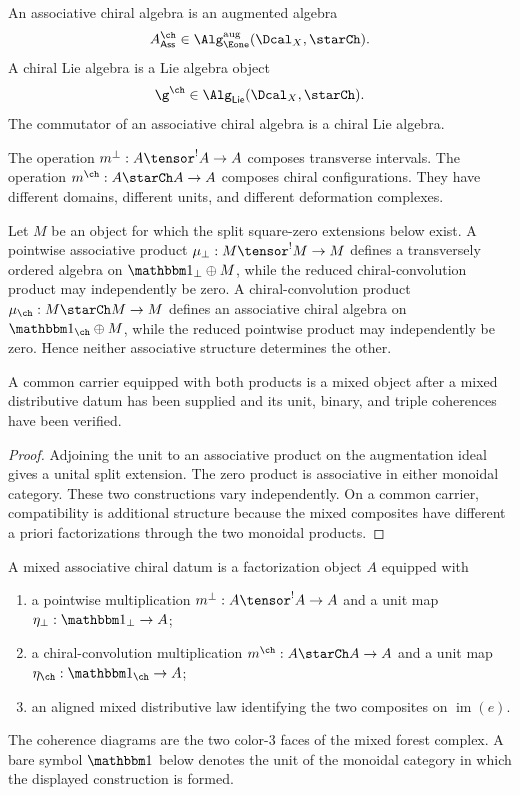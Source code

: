 \begin{definition}
An associative chiral algebra is an augmented algebra
\[
 A^{\ch}_{\mathsf{Ass}}
 \in\Alg_{\Eone}^{\mathrm{aug}}(\Dcal_X,\starCh).
\]
A chiral Lie algebra is a Lie algebra object
\[
 \g^{\ch}\in\Alg_{\mathsf{Lie}}(\Dcal_X,\starCh).
\]
The commutator of an associative chiral algebra is a chiral Lie algebra.
\end{definition}

The operation $m^\perp:A\tensor^!A\to A$ composes transverse intervals.  The operation
$m^{\ch}:A\starCh A\to A$ composes chiral configurations.  They have different domains, different units, and different deformation complexes.

\begin{theorem}
Let $M$ be an object for which the split square-zero extensions below exist.  A pointwise associative product $\mu_\perp:M\tensor^!M\to M$ defines a transversely ordered algebra on $\mathbbm1_\perp\oplus M$, while the reduced chiral-convolution product may independently be zero.  A chiral-convolution product $\mu_{\ch}:M\starCh M\to M$ defines an associative chiral algebra on $\mathbbm1_{\ch}\oplus M$, while the reduced pointwise product may independently be zero.  Hence neither associative structure determines the other.

A common carrier equipped with both products is a mixed object after a mixed distributive datum has been supplied and its unit, binary, and triple coherences have been verified.
\end{theorem}
\begin{proof}
Adjoining the unit to an associative product on the augmentation ideal gives a unital split extension.  The zero product is associative in either monoidal category.  These two constructions vary independently.  On a common carrier, compatibility is additional structure because the mixed composites have different a priori factorizations through the two monoidal products.
\end{proof}

\begin{definition}
A mixed associative chiral datum is a factorization object $A$ equipped with
\begin{enumerate}
\item a pointwise multiplication $m^\perp:A\tensor^!A\to A$ and a unit map $\eta_\perp:\mathbbm1_\perp\to A$;
\item a chiral-convolution multiplication $m^{\ch}:A\starCh A\to A$ and a unit map $\eta_{\ch}:\mathbbm1_{\ch}\to A$;
\item an aligned mixed distributive law identifying the two composites on $\operatorname{im}(e)$.
\end{enumerate}
The coherence diagrams are the two color-$3$ faces of the mixed forest complex.  A bare symbol $\mathbbm1$ below denotes the unit of the monoidal category in which the displayed construction is formed.
\end{definition}

